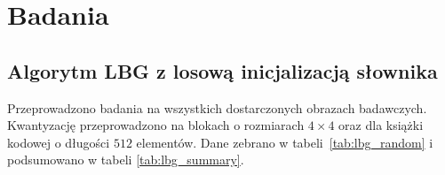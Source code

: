\documentclass{article}
\begin{document}
\section{Badania}

\subsection{Algorytm LBG z losową inicjalizacją słownika}

Przeprowadzono badania na wszystkich dostarczonych obrazach badawczych. Kwantyzację przeprowadzono na blokach o rozmiarach $4 \times 4$ oraz dla książki
kodowej o długości $512$ elementów. Dane zebrano w \mbox{tabeli \ref{tab:lbg_random}} i podsumowano w tabeli \mbox{\ref{tab:lbg_summary}}.

\end{document}
